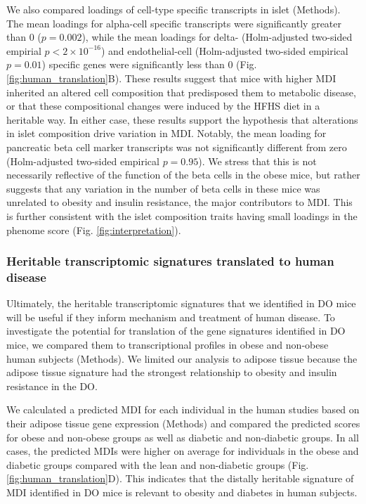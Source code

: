 \documentclass[
]{article}
\begin{document}
We also compared loadings of cell-type specific transcripts in islet
(Methods). The mean loadings for alpha-cell specific transcripts were
significantly greater than 0 (\(p = 0.002\)), while the mean loadings
for delta- (Holm-adjusted two-sided empirial \(p < 2\times10^{-16}\))
and endothelial-cell (Holm-adjusted two-sided empirical \(p = 0.01\))
specific genes were significantly less than 0 (Fig.
\ref{fig:human_translation}B). These results suggest that mice with
higher MDI inherited an altered cell composition that predisposed them
to metabolic disease, or that these compositional changes were induced
by the HFHS diet in a heritable way. In either case, these results
support the hypothesis that alterations in islet composition drive
variation in MDI. Notably, the mean loading for pancreatic beta cell
marker transcripts was not significantly different from zero
(Holm-adjusted two-sided empirical \(p = 0.95\)). We stress that this is
not necessarily reflective of the function of the beta cells in the
obese mice, but rather suggests that any variation in the number of beta
cells in these mice was unrelated to obesity and insulin resistance, the
major contributors to MDI. This is further consistent with the islet
composition traits having small loadings in the phenome score (Fig.
\ref{fig:interpretation}).

\subsubsection{Heritable transcriptomic signatures translated to human
disease}\label{heritable-transcriptomic-signatures-translated-to-human-disease}

Ultimately, the heritable transcriptomic signatures that we identified
in DO mice will be useful if they inform mechanism and treatment of
human disease. To investigate the potential for translation of the gene
signatures identified in DO mice, we compared them to transcriptional
profiles in obese and non-obese human subjects (Methods). We limited our
analysis to adipose tissue because the adipose tissue signature had the
strongest relationship to obesity and insulin resistance in the DO.

We calculated a predicted MDI for each individual in the human studies
based on their adipose tissue gene expression (Methods) and compared the
predicted scores for obese and non-obese groups as well as diabetic and
non-diabetic groups. In all cases, the predicted MDIs were higher on
average for individuals in the obese and diabetic groups compared with
the lean and non-diabetic groups (Fig. \ref{fig:human_translation}D).
This indicates that the distally heritable signature of MDI identified
in DO mice is relevant to obesity and diabetes in human subjects.
\end{document}
